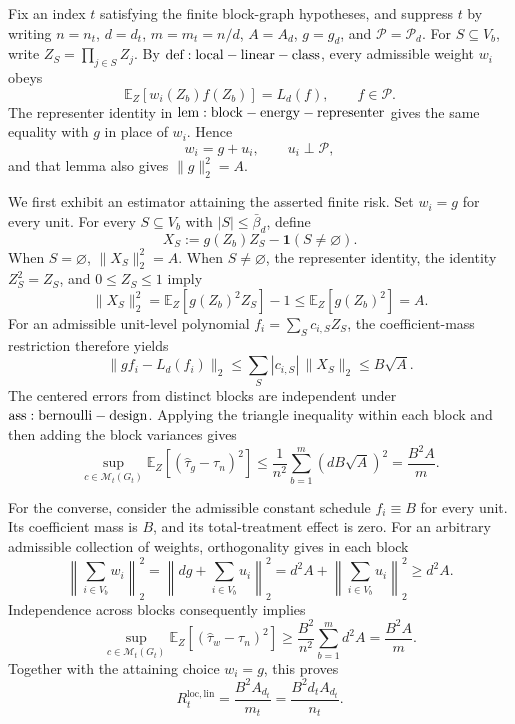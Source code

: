 Fix an index \(t\) satisfying the finite block-graph hypotheses, and suppress \(t\) by writing \(n=n_t\), \(d=d_t\), \(m=m_t=n/d\), \(A=A_d\), \(g=g_d\), and \(\mathcal P=\mathcal P_d\). For \(S\subseteq V_b\), write \(Z_S=\prod_{j\in S}Z_j\). By \({\rm def:local-linear-class}\), every admissible weight \(w_i\) obeys
\[
\mathbb E_Z[w_i(Z_b)f(Z_b)]=L_d(f),\qquad f\in\mathcal P.
\]
The representer identity in \({\rm lem:block-energy-representer}\) gives the same equality with \(g\) in place of \(w_i\). Hence
\[
w_i=g+u_i,\qquad u_i\perp\mathcal P,
\]
and that lemma also gives \(\|g\|_2^2=A\).

We first exhibit an estimator attaining the asserted finite risk. Set \(w_i=g\) for every unit. For every \(S\subseteq V_b\) with \(|S|\le\bar\beta_d\), define
\[
X_S:=g(Z_b)Z_S-\mathbf 1(S\ne\varnothing).
\]
When \(S=\varnothing\), \(\|X_S\|_2^2=A\). When \(S\ne\varnothing\), the representer identity, the identity \(Z_S^2=Z_S\), and \(0\le Z_S\le1\) imply
\[
\|X_S\|_2^2
=\mathbb E_Z[g(Z_b)^2Z_S]-1
\le \mathbb E_Z[g(Z_b)^2]
=A.
\]
For an admissible unit-level polynomial \(f_i=\sum_Sc_{i,S}Z_S\), the coefficient-mass restriction therefore yields
\[
\|g f_i-L_d(f_i)\|_2
\le\sum_S|c_{i,S}|\,\|X_S\|_2
\le B\sqrt A.
\]
The centered errors from distinct blocks are independent under \({\rm ass:bernoulli-design}\). Applying the triangle inequality within each block and then adding the block variances gives
\[
\sup_{c\in\mathcal M_t(G_t)}
\mathbb E_Z[(\widehat\tau_g-\tau_n)^2]
\le \frac1{n^2}\sum_{b=1}^m(dB\sqrt A)^2
=\frac{B^2A}{m}.
\]

For the converse, consider the admissible constant schedule \(f_i\equiv B\) for every unit. Its coefficient mass is \(B\), and its total-treatment effect is zero. For an arbitrary admissible collection of weights, orthogonality gives in each block
\[
\left\|\sum_{i\in V_b}w_i\right\|_2^2
=\left\|dg+\sum_{i\in V_b}u_i\right\|_2^2
=d^2A+\left\|\sum_{i\in V_b}u_i\right\|_2^2
\ge d^2A.
\]
Independence across blocks consequently implies
\[
\sup_{c\in\mathcal M_t(G_t)}
\mathbb E_Z[(\widehat\tau_w-\tau_n)^2]
\ge \frac{B^2}{n^2}\sum_{b=1}^m d^2A
=\frac{B^2A}{m}.
\]
Together with the attaining choice \(w_i=g\), this proves
\[
R_t^{\mathrm{loc,lin}}=\frac{B^2A_{d_t}}{m_t}
=\frac{B^2d_tA_{d_t}}{n_t}.
\]

